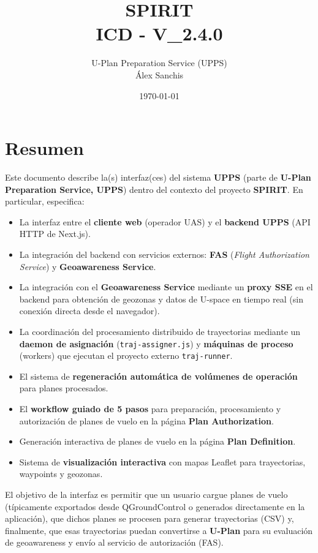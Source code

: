 \documentclass[12pt,a4paper]{article}
\title{ SPIRIT \\ \small{ICD - V\_{2.4.0}}}
\author{U-Plan Preparation Service (UPPS) \\ Álex Sanchis}
\date{\today}
\begin{document}
\maketitle

\section*{Resumen}
Este documento describe la(s) interfaz(ces) del sistema \textbf{UPPS} (parte de \textbf{U-Plan Preparation Service, UPPS}) dentro del contexto del proyecto \textbf{SPIRIT}. En particular, especifica:
\begin{itemize}
    \item La interfaz entre el \textbf{cliente web} (operador UAS) y el \textbf{backend UPPS} (API HTTP de Next.js).
    \item La integración del backend con servicios externos: \textbf{FAS} (\textit{Flight Authorization Service}) y \textbf{Geoawareness Service}.
    \item La integración con el \textbf{Geoawareness Service} mediante un \textbf{proxy SSE} en el backend para obtención de geozonas y datos de U-space en tiempo real (sin conexión directa desde el navegador).
    \item La coordinación del procesamiento distribuido de trayectorias mediante un \textbf{daemon de asignación} (\texttt{traj-assigner.js}) y \textbf{máquinas de proceso} (workers) que ejecutan el proyecto externo \texttt{traj-runner}.
    \item El sistema de \textbf{regeneración automática de volúmenes de operación} para planes procesados.
    \item El \textbf{workflow guiado de 5 pasos} para preparación, procesamiento y autorización de planes de vuelo en la página \textbf{Plan Authorization}.
    \item Generación interactiva de planes de vuelo en la página \textbf{Plan Definition}.
    \item Sistema de \textbf{visualización interactiva} con mapas Leaflet para trayectorias, waypoints y geozonas.
\end{itemize}

El objetivo de la interfaz es permitir que un usuario cargue planes de vuelo (típicamente exportados desde QGroundControl o generados directamente en la aplicación), que dichos planes se procesen para generar trayectorias (CSV) y, finalmente, que esas trayectorias puedan convertirse a \textbf{U-Plan} para su evaluación de geoawareness y envío al servicio de autorización (FAS).
\end{document}
